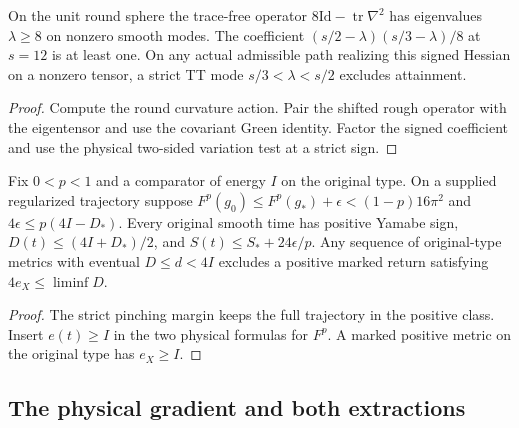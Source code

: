 \begin{proposition}
\label{prop:ed49-round}
\leanok
On the unit round sphere the trace-free operator $8\mathrm{Id}-\operatorname{tr}\nabla^2$
has eigenvalues $\lambda\ge8$ on nonzero smooth modes. The coefficient
$(s/2-\lambda)(s/3-\lambda)/8$ at $s=12$ is at least one.
On any actual admissible path realizing this signed Hessian on a nonzero
tensor, a strict TT mode $s/3<\lambda<s/2$ excludes attainment.
\end{proposition}
\begin{proof}
\leanok
Compute the round curvature action. Pair the shifted rough operator with
the eigentensor and use the covariant Green identity. Factor the signed
coefficient and use the physical two-sided variation test at a strict sign.
\end{proof}

\begin{proposition}
\label{prop:ed49-margin}
\leanok
Fix $0<p<1$ and a comparator of energy $I$ on the original type.
On a supplied regularized trajectory suppose
$F^p(g_0)\le F^p(g_*)+\epsilon<(1-p)16\pi^2$ and
$4\epsilon\le p(4I-D_*)$. Every original smooth time has positive Yamabe
sign, $D(t)\le(4I+D_*)/2$, and $S(t)\le S_*+24\epsilon/p$.
Any sequence of original-type metrics with eventual $D\le d<4I$ excludes
a positive marked return satisfying $4e_X\le\liminf D$.
\end{proposition}
\begin{proof}
\leanok
The strict pinching margin keeps the full trajectory in the positive class.
Insert $e(t)\ge I$ in the two physical formulas for $F^p$.
A marked positive metric on the original type has $e_X\ge I$.
\end{proof}

\subsection{The physical gradient and both extractions}

